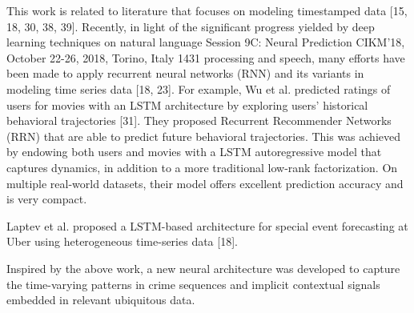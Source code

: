 \noindent This work is related to literature that focuses on modeling timestamped data [15, 18, 30, 38, 39]. Recently, in light of the significant progress yielded by deep learning techniques on natural language Session 9C: Neural Prediction CIKM’18, October 22-26, 2018, Torino, Italy 1431 processing and speech, many efforts have been made to apply recurrent neural networks (RNN) and its variants in modeling time series data [18, 23]. For example, Wu et al. predicted ratings of users for movies with an LSTM architecture by exploring users’ historical behavioral trajectories [31]. They proposed Recurrent Recommender Networks (RRN) that are able to predict future behavioral trajectories. This was achieved by endowing both users and movies with a LSTM autoregressive model that captures dynamics, in addition to a more traditional low-rank factorization. On multiple real-world datasets, their model offers
excellent prediction accuracy and is very compact.

\noindent Laptev et al. proposed a LSTM-based
architecture for special event forecasting at Uber using heterogeneous time-series data [18]. 

\noindent Inspired by the above work, a new neural architecture was developed to capture the time-varying patterns in crime sequences and implicit contextual signals embedded in relevant ubiquitous data.

